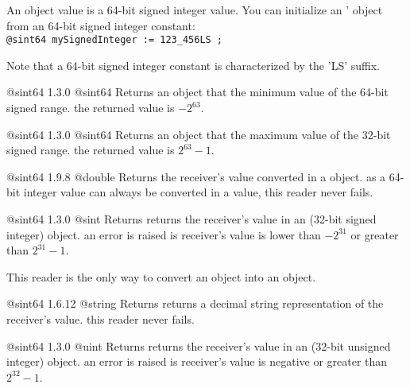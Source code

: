 
An  object value is a 64-bit signed integer value. You can initialize an ' object from an 64-bit signed integer constant:\\

\texttt{@sint64 mySignedInteger := 123\_456LS ;}

Note that a 64-bit signed integer constant is characterized by the 'LS' suffix.




{@sint64}
{1.3.0}
{@sint64}
{Returns an  object that the minimum value of the 64-bit signed range.}
{the returned value is $-2^{63}$.}





{@sint64}
{1.3.0}
{@sint64}
{Returns an  object that the maximum value of the 32-bit signed range.}
{the returned value is $2^{63}-1$.}





{@sint64}
{1.9.8}
{@double}
{Returns the receiver's value converted in a  object.}
{as a 64-bit integer value can always be converted in a  value, this reader never fails.}




{@sint64}
{1.3.0}
{@sint}
{Returns returns the receiver's value in an  (32-bit signed integer) object.}
{an error is raised is receiver's value is lower than $-2^{31}$ or greater than $2^{31}-1$.}

This reader is the only way to convert an  object into an  object.





{@sint64}
{1.6.12}
{@string}
{Returns returns a decimal string representation of the receiver's value.}
{this reader never fails.}








{@sint64}
{1.3.0}
{@uint}
{Returns returns the receiver's value in an  (32-bit unsigned integer) object.}
{an error is raised is receiver's value is negative or greater than $2^{32}-1$.}

